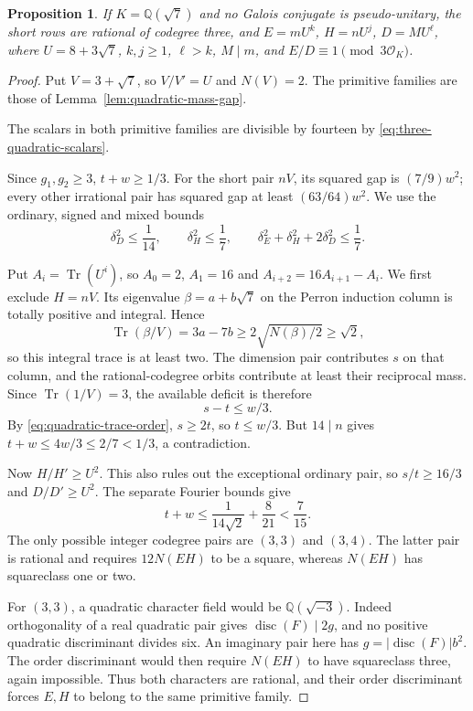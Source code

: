 \documentclass[11pt,reqno]{amsart}
\newtheorem{proposition}[theorem]{Proposition}
\theoremstyle{remark}\newtheorem{remark}[theorem]{Remark}
\numberwithin{equation}{section}
\begin{document}
\begin{proposition}\label{prop:r6-quadratic-twenty-eight}
If $K=\mathbb Q(\sqrt7)$ and no Galois conjugate is pseudo-unitary,
the short rows are rational of codegree three, and
$E=mU^k$, $H=nU^j$, $D=MU^\ell$, where $U=8+3\sqrt7$,
$k,j\ge1$, $\ell>k$, $M\mid m$, and
$E/D\equiv1\pmod{3\mathcal O_K}$.
\end{proposition}
\begin{proof}
Put $V=3+\sqrt7$, so $V/V'=U$ and $N(V)=2$.
The primitive families are those of Lemma~\ref{lem:quadratic-mass-gap}.

The scalars in both primitive families are divisible by fourteen
by \eqref{eq:three-quadratic-scalars}.

Since $g_1,g_2\ge3$, $t+w\ge1/3$.
For the short pair $nV$, its squared gap is $(7/9)w^2$;
every other irrational pair has squared gap at least
$(63/64)w^2$.
We use the ordinary, signed and mixed bounds
\[
 \delta_D^2\le\frac1{14},\qquad
 \delta_H^2\le\frac17,\qquad
 \delta_E^2+\delta_H^2+2\delta_D^2\le\frac17.
\]

Put $A_i=\operatorname{Tr}(U^i)$, so $A_0=2$, $A_1=16$ and
$A_{i+2}=16A_{i+1}-A_i$. We first exclude $H=nV$. Its eigenvalue
$\beta=a+b\sqrt7$ on the Perron induction column is totally positive
and integral. Hence
\[
 \operatorname{Tr}(\beta/V)=3a-7b\ge2\sqrt{N(\beta)/2}\ge\sqrt2,
\]
so this integral trace is at least two. The dimension pair contributes
$s$ on that column, and the rational-codegree orbits contribute at
least their reciprocal mass. Since $\operatorname{Tr}(1/V)=3$, the
available deficit is therefore
\begin{equation}\label{eq:r6-twenty-eight-short}
                       s-t\le w/3 .
\end{equation}
By \eqref{eq:quadratic-trace-order}, $s\ge2t$, so $t\le w/3$.
But $14\mid n$ gives $t+w\le4w/3\le2/7<1/3$, a contradiction.

Now $H/H'\ge U^2$. This also rules out the exceptional ordinary pair,
so $s/t\ge16/3$ and $D/D'\ge U^2$. The separate Fourier bounds give
\[
 t+w\le\frac1{14\sqrt2}+\frac8{21}<\frac7{15}.
\]
The only possible integer codegree pairs are $(3,3)$ and $(3,4)$.
The latter pair is rational and requires $12N(EH)$ to be a square,
whereas $N(EH)$ has squareclass one or two.

For $(3,3)$, a quadratic character field would be
$\mathbb Q(\sqrt{-3})$.
Indeed orthogonality of a real quadratic pair gives
$\operatorname{disc}(F)\mid2g$, and no positive quadratic
discriminant divides six.  An imaginary pair here has
$g=|\operatorname{disc}(F)|b^2$.
The order discriminant would then require $N(EH)$ to have
squareclass three, again impossible.
Thus both characters are rational, and their order discriminant
forces $E,H$ to belong to the same primitive family.


\end{proof}
\end{document}

